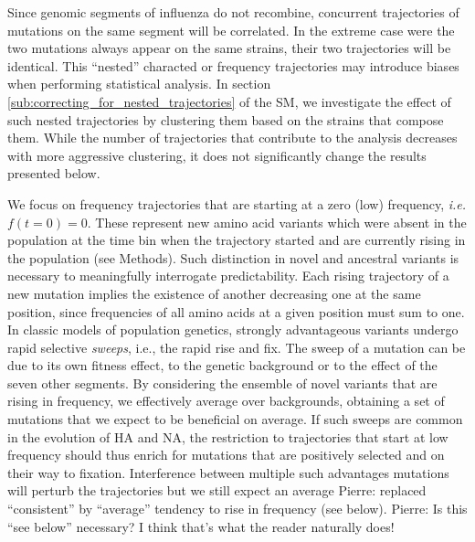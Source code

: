 \documentclass[reprint,amsmath,amssymb,superscriptaddress,showpacs,rmp]{revtex4-1}
\newcommand{\pierre}[1]{{\color{red}Pierre: #1}}
\begin{document}
Since genomic segments of influenza do not recombine, concurrent trajectories of mutations on the same segment will be correlated.
In the extreme case were the two mutations always appear on the same strains, their two trajectories will be identical.
This ``nested'' characted or frequency trajectories may introduce biases when performing statistical analysis.
In section \ref{sub:correcting_for_nested_trajectories} of the SM, we investigate the effect of such nested trajectories by clustering them based on the strains that compose them.
While the number of trajectories that contribute to the analysis decreases with more aggressive clustering, it does not significantly change the results presented below.

We focus on frequency trajectories that are starting at a zero (low) frequency, \emph{i.e.} $f(t=0)=0$.
These represent new amino acid variants which were absent in the population at the time bin when the trajectory started and are currently rising in the population (see Methods).
Such distinction in novel and ancestral variants is necessary to meaningfully interrogate predictability.
Each rising trajectory of a new mutation implies the existence of another decreasing one at the same position, since frequencies of all amino acids at a given position must sum to one.
In classic models of population genetics, strongly advantageous variants undergo rapid selective \emph{sweeps}, i.e., the rapid rise and fix.
The sweep of a mutation can be due to its own fitness effect, to the genetic background or to the effect of the seven other segments.
By considering the ensemble of novel variants that are rising in frequency, we effectively average over backgrounds, obtaining a set of mutations that we expect to be beneficial on average.
If such sweeps are common in the evolution of HA and NA, the restriction to trajectories that start at low frequency should thus enrich for mutations that are positively selected and on their way to fixation.
Interference between multiple such advantages mutations will perturb the trajectories \citep{illingworth_components_2012} but we still expect an average \pierre{replaced ``consistent'' by ``average''} tendency to rise in frequency (see below). \pierre{Is this ``see below'' necessary? I think that's what the reader naturally does! }
\end{document}

